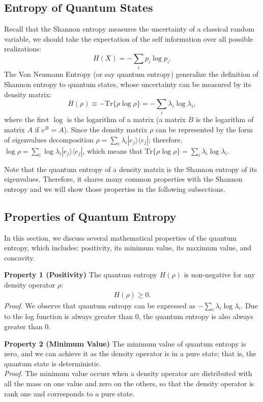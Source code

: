 \subsection{Entropy of Quantum States}
Recall that the Shannon entropy measures the uncertainty of a classical random variable, we should take the expectation of the self information over all possible realizations:
\begin{equation}
H(X) = -\sum_i p_i \log p_i.
\end{equation}
The Von Neumann Entropy (or say quantum entropy) generalize the definition of Shannon entropy to quantum states, whose uncertainty can be measured by its density matrix:
\begin{equation}
H(\rho) \equiv - \text{Tr} \{ \rho \log \rho \} = -\sum_{i} \lambda_i \log \lambda_i,
\end{equation}
where the first $\log$ is the logarithm of a matrix (a matrix $B$ is the logarithm of matrix $A$ if $e^B = A$).
Since the density matrix $\rho$ can be represented by the form of eigenvalues decomposition $\rho = \sum_{i} \lambda_i |e_j\rangle \langle e_j|$; therefore, $\log \rho = \sum_{i} \log \lambda_i |e_j\rangle \langle e_j|$, which means that $\text{Tr} \{ \rho \log \rho \} = \sum_{i} \lambda_i \log \lambda_i$.

Note that the quantum entropy of a density matrix is the Shannon entropy of its eigenvalues.
Therefore, it shares many common properties with the Shannon entropy and we will show those properties in the following subsections.

\subsection{Properties of Quantum Entropy}
In this section, we discuss several mathematical properties of the quantum entropy, which includes: positivity, its minimum value, its maximum value, and concavity.

\textbf{Property 1 (Positivity)} The quantum entropy $H(\rho)$ is non-negative for any density operator $\rho$:
\begin{align}
H(\rho) \geq 0.
\end{align}
\textit{Proof.} We observe that quantum entropy can be expressed as  $-\sum_{i} \lambda_i \log \lambda_i$. Due to the log function is always greater than 0, the quantum entropy is also always greater than 0.

\textbf{Property 2 (Minimum Value)}
The minimum value of quantum entropy is zero, and we can achieve it as the density operator is in a pure state; that is, the quantum state is deterministic. \\
\textit{Proof.} The minimum value occurs when a density operator are distributed with all the mass on one value and zero on the others, so that the density operator is rank one and corresponds to a pure state.


